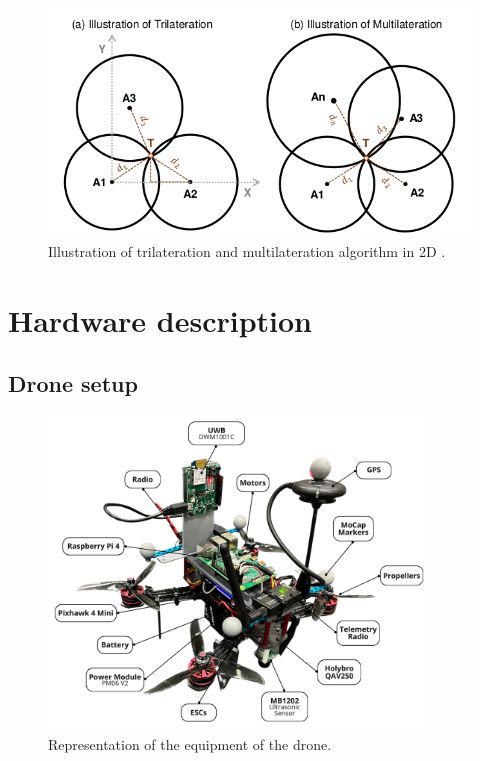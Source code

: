 \documentclass[journal]{IEEEtran}
\begin{document}
\begin{figure}
    \centering
    \includegraphics[scale=0.30]{Images/sphere.png}
    \caption{Illustration of trilateration and multilateration algorithm in 2D \cite{uwb_algorithms}.}
    \label{fig:sphere}
\end{figure}

\section{Hardware description}
\label{hardware}
\subsection{Drone setup} \label{Drone-setup}

\begin{figure}
    \centering
    \includegraphics[width=0.9\textwidth]{Images/drone_label.png}
    \caption{Representation of the equipment of the drone.}
    \label{fig:drone}
\end{figure}
\end{document}
